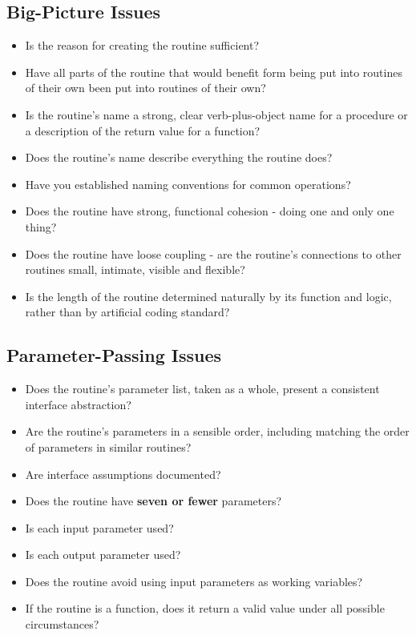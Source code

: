 \subsection{Big-Picture Issues}
\begin{itemize}
\item Is the reason for creating the routine sufficient?
\item Have all parts of the routine that would benefit form being put into routines of their own been put into routines of their own?
\item Is the routine's name a strong, clear verb-plus-object name for a procedure or a description of the return value for a function?
\item Does the routine's name describe everything the routine does?
\item Have you established naming conventions for common operations?
\item Does the routine have strong, functional cohesion - doing one and only one thing?
\item Does the routine have loose coupling - are the routine's connections to other routines small, intimate, visible and flexible?
\item Is the length of the routine determined naturally by its function and logic, rather than by artificial coding standard?
\end{itemize}
\subsection{Parameter-Passing Issues}
\begin{itemize}
\item Does the routine's parameter list, taken as a whole, present a consistent interface abstraction? 
\item Are the routine's parameters in a sensible order, including matching the order of parameters in similar routines?
\item Are interface assumptions documented?
\item Does the routine have \textbf{seven or fewer} parameters?
\item Is each input parameter used?
\item Is each output parameter used?
\item Does the routine avoid using input parameters as working variables? 
\item If the routine is a function, does it return a valid value under all possible circumstances?
\end{itemize}

